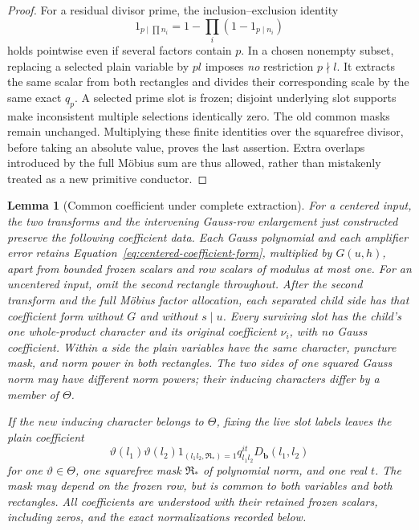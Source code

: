 \documentclass[12pt]{article}
\newtheorem{lemma}[theorem]{Lemma}
\begin{document}
\begin{proof}
For a residual divisor prime, the inclusion--exclusion identity
\[
 1_{p\mid\prod n_i}
   =1-\prod_i(1-1_{p\mid n_i})
\]
holds pointwise even if several factors contain \(p\).
In a chosen nonempty subset, replacing a selected plain variable
by \(pl\) imposes \emph{no} restriction \(p\nmid l\).
It extracts the same scalar from both rectangles and divides
their corresponding scale by the same exact \(q_p\).
A selected prime slot is frozen; disjoint underlying slot supports
make inconsistent multiple selections identically zero.
The old common masks remain unchanged.  Multiplying these finite
identities over the squarefree divisor, before taking an absolute
value, proves the last assertion.  Extra overlaps introduced by
the full M\"obius sum are thus allowed, rather than mistakenly
treated as a new primitive conductor.
\end{proof}

\begin{lemma}[Common coefficient under complete extraction]
\label{lem:centered-coefficient-invariant}
For a centered input, the two transforms and the intervening Gauss-row
enlargement just constructed preserve the following coefficient data.
Each Gauss polynomial and each amplifier error retains
Equation~\eqref{eq:centered-coefficient-form}, multiplied by \(G(u,h)\),
apart from bounded frozen scalars and row scalars of modulus at most one.
For an uncentered input, omit the second rectangle throughout.
After the second transform and the full M\"obius factor allocation, each
separated child side has that coefficient form without \(G\) and without
\(s\mid u\).  Every surviving slot has the child's one whole-product
character and its original coefficient \(\nu_i\), with no Gauss coefficient.
Within a side the plain variables have the same character, puncture mask,
and norm power in both rectangles.  The two sides of one squared Gauss norm
may have different norm powers; their inducing characters differ by a
member of \(\Theta\).

If the new inducing character belongs to \(\Theta\), fixing the live slot
labels leaves the plain coefficient
\[
 \vartheta(l_1)\vartheta(l_2)
 1_{(l_1l_2,\mathfrak R_*)=1}q_{l_1l_2}^{it}D_{\mathbf b}(l_1,l_2)
\]
for one \(\vartheta\in\Theta\), one squarefree mask
\(\mathfrak R_*\) of polynomial norm, and one real \(t\).
The mask may depend on the frozen row, but is common to both variables
and both rectangles.  All coefficients are understood with their retained
frozen scalars, including zeros, and the exact normalizations recorded below.
\end{lemma}
\end{document}
